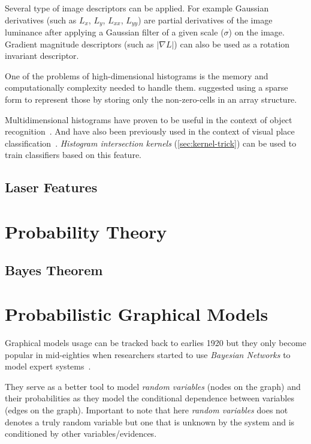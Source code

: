 Several type of image descriptors can be applied.
For example Gaussian derivatives (such as $L_x$, $L_y$, $L_{xx}$, $L_{yy}$) are
partial derivatives of the image luminance after applying a Gaussian filter of a
given scale ($\sigma$) on the image. Gradient magnitude descriptors
(such as $|\nabla L|$) can also be used as a rotation invariant descriptor.


One of the problems of high-dimensional histograms is the memory and
computationally complexity needed to handle them.
\cite{linde2004object} suggested using a sparse form to represent those by
storing only the non-zero-cells in an array structure.

Multidimensional histograms have proven to be useful in the context of object
recognition~\citep{schiele1996object}. And have also been previously used in
the context of visual place classification~\cite{pronobis2010ijrr}.
\emph{Histogram intersection kernels} (\autoref{sec:kernel-trick}) can be used
to train classifiers based on this feature.

\subsection{Laser Features}


\clearpage
\section{Probability Theory}
\subsection{Bayes Theorem}


\section{Probabilistic Graphical Models}
\label{sec:graphical-models}
Graphical models usage can be tracked back to earlies 1920 but they only become
popular in mid-eighties when researchers started to use \emph{Bayesian Networks}
to model expert systems~\citep{borgelt2002graphical}.

They serve as a better tool to model \emph{random variables}
(nodes on the graph) and their probabilities as they model the conditional
dependence between variables (edges on the graph). Important to note that here
\emph{random variables} does not denotes a truly random variable but one that is
unknown by the system and is conditioned by other variables/evidences.

